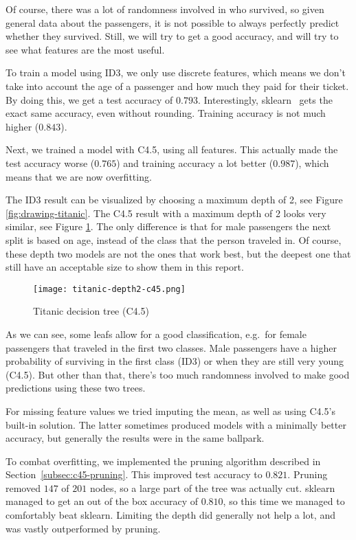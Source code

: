 \documentclass[a4paper]{article}
\begin{document}
Of course, there was a lot of randomness involved in who survived, so given general data about the passengers, it is not possible to always perfectly predict whether they survived. Still, we will try to get a good accuracy, and will try to see what features are the most useful.

To train a model using ID3, we only use discrete features, which means we don't take into account the age of a passenger and how much they paid for their ticket. By doing this, we get a test accuracy of $0.793$. Interestingly, sklearn~\cite{scikit-learn} gets the exact same accuracy, even without rounding. Training accuracy is not much higher ($0.843$).

Next, we trained a model with C4.5, using all features. This actually made the test accuracy worse ($0.765$) and training accuracy a lot better ($0.987$), which means that we are now overfitting.

The ID3 result can be visualized by choosing a maximum depth of 2, see Figure \ref{fig:drawing-titanic}. The C4.5 result with a maximum depth of 2 looks very similar, see Figure \ref{fig:titanic}. The only difference is that for male passengers the next split is based on age, instead of the class that the person traveled in. Of course, these depth two models are not the ones that work best, but the deepest one that still have an acceptable size to show them in this report.

\begin{figure}[h]
	\texttt{[image: titanic-depth2-c45.png]}
    \caption{Titanic decision tree (C4.5)}
    \label{fig:titanic}
\end{figure}

As we can see, some leafs allow for a good classification, e.g.\ for female passengers that traveled in the first two classes. Male passengers have a higher probability of surviving in the first class (ID3) or when they are still very young (C4.5). But other than that, there's too much randomness involved to make good predictions using these two trees.

For missing feature values we tried imputing the mean, as well as using C4.5's built-in solution. The latter sometimes produced models with a minimally better accuracy, but generally the results were in the same ballpark.

To combat overfitting, we implemented the pruning algorithm described in Section~\ref{subsec:c45-pruning}. This improved test accuracy to $0.821$. Pruning removed $147$ of $201$ nodes, so a large part of the tree was actually cut. sklearn managed to get an out of the box accuracy of $0.810$, so this time we managed to comfortably beat sklearn.
Limiting the depth did generally not help a lot, and was vastly outperformed by pruning.
\end{document}
